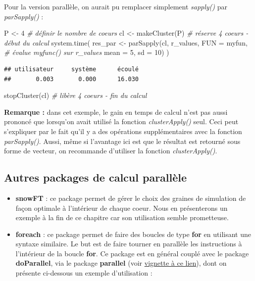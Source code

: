 \documentclass[
]{book}
\newenvironment{Shaded}{\begin{snugshade}}{\end{snugshade}}
\newcommand{\AttributeTok}[1]{\textcolor[rgb]{0.77,0.63,0.00}{#1}}
\newcommand{\CommentTok}[1]{\textcolor[rgb]{0.56,0.35,0.01}{\textit{#1}}}
\newcommand{\DecValTok}[1]{\textcolor[rgb]{0.00,0.00,0.81}{#1}}
\newcommand{\FunctionTok}[1]{\textcolor[rgb]{0.00,0.00,0.00}{#1}}
\newcommand{\NormalTok}[1]{#1}
\newcommand{\OtherTok}[1]{\textcolor[rgb]{0.56,0.35,0.01}{#1}}
\theoremstyle{definition}
\theoremstyle{definition}
\theoremstyle{definition}
\theoremstyle{definition}
\theoremstyle{remark}
\begin{document}
Pour la version parallèle, on aurait pu remplacer simplement \emph{sapply()} par \emph{parSapply()} :

\begin{Shaded}
\begin{Highlighting}[]
\NormalTok{P }\OtherTok{\textless{}{-}} \DecValTok{4}  \CommentTok{\# définir le nombre de coeurs }
\NormalTok{cl }\OtherTok{\textless{}{-}} \FunctionTok{makeCluster}\NormalTok{(P) }\CommentTok{\# réserve 4 coeurs {-} début du calcul }
\FunctionTok{system.time}\NormalTok{(}
\NormalTok{  res\_par }\OtherTok{\textless{}{-}} \FunctionTok{parSapply}\NormalTok{(cl, r\_values, }\AttributeTok{FUN =}\NormalTok{ myfun, }\CommentTok{\# évalue myfunc() sur r\_values  }
                    \AttributeTok{mean =} \DecValTok{5}\NormalTok{, }\AttributeTok{sd =} \DecValTok{10}\NormalTok{) }
\NormalTok{)  }
\end{Highlighting}
\end{Shaded}

\begin{verbatim}
## utilisateur     système      écoulé 
##       0.003       0.000      16.030
\end{verbatim}

\begin{Shaded}
\begin{Highlighting}[]
\FunctionTok{stopCluster}\NormalTok{(cl) }\CommentTok{\# libère 4 coeurs {-} fin du calcul }
\end{Highlighting}
\end{Shaded}

\textbf{Remarque :} dans cet exemple, le gain en temps de calcul n'est pas aussi prononcé que lorsqu'on avait utilisé la fonction \emph{clusterApply()} seul. Ceci peut s'expliquer par le fait qu'il y a des opérations supplémentaires avec la fonction \emph{parSapply()}. Aussi, même si l'avantage ici est que le résultat est retourné sous forme de vecteur, on recommande d'utiliser la fonction \emph{clusterApply()}.

\hypertarget{autres-packages-de-calcul-paralluxe8le}{%
\subsection{Autres packages de calcul parallèle}\label{autres-packages-de-calcul-paralluxe8le}}

\begin{itemize}
\item
  \textbf{snowFT} : ce package permet de gérer le choix des graines de simulation de façon optimale à l'intérieur de chaque coeur. Nous en présenterons un exemple à la fin de ce chapitre car son utilisation semble prometteuse.
\item
  \textbf{foreach} : ce package permet de faire des boucles de type \textbf{for} en utilisant une syntaxe similaire. Le but est de faire tourner en parallèle les instructions à l'intérieur de la boucle \textbf{for}. Ce package est en général couplé avec le package \textbf{doParallel}, via le package \textbf{parallel} (voir \href{https://cran.r-project.org/web/packages/doParallel/vignettes/gettingstartedParallel.pdf}{vignette à ce lien}), dont on présente ci-dessous un exemple d'utilisation :
\end{itemize}
\end{document}
